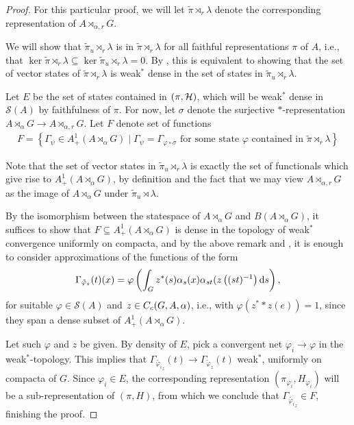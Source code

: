 \begin{proof}
For this particular proof, we will let $\tilde \pi \rtimes_r \lambda$ denote the corresponding representation of $A \rtimes_{\alpha,r}G$.

We will show that $\tilde \pi_u \rtimes_r \lambda$ is  in $\tilde \pi \rtimes_r \lambda$ for all faithful representations $\pi$ of $A$, i.e., that $\ker \tilde \pi \rtimes_r \lambda \subseteq \ker\tilde \pi_u \rtimes_r \lambda = 0$. By \cite[80]{dixmier1969c}, this is equivalent to showing that the set of vector states of $\tilde \pi \rtimes_r \lambda$ is weak$^*$ dense in the set of states in $\tilde \pi_u \rtimes_r \lambda$.

Let $E$ be the set of states contained in $(\pi,\mathcal{H})$, which will be weak$^*$ dense in $\mathcal{S}(A)$ by faithfulness of $\pi$. For now, let $\sigma$ denote the surjective $*$-representation $A \rtimes_\alpha G \to A \rtimes_{\alpha,r}G$. Let $F$ denote set of functions
\begin{align*}
	F = \left\{  \Gamma_\psi \in A_+^1(A\rtimes_\alpha G) \mid \Gamma_\psi = \Gamma_{\varphi \circ \sigma} \text{ for some state } \varphi \text{ contained in } \tilde \pi \rtimes_r \lambda \right\}
\end{align*}

Note that the set of vector states in $\tilde \pi_u \rtimes_r \lambda$ is exactly the set of functionals which give rise to $A_+^1(A \rtimes_\alpha G)$, by definition and the fact that we may view $A \rtimes_{\alpha,r} G$ as the image of $A \rtimes_\alpha G$ under $\tilde \pi_u \rtimes \lambda$.

By the isomorphism between the statespace of $A \rtimes_\alpha G$ and $B(A \rtimes_\alpha G)$, it suffices to show that $F \subseteq A_+^1(A \rtimes_\alpha G)$ is dense in the topology of weak$^*$ convergence uniformly on compacta, and by the above remark and , it is enough to consider approximations of the functions of the form
\begin{align*}
	\Gamma_{\tilde \varphi_z}(t) (x) =\varphi\left( \int_G z^*(s) \alpha_s(x) \alpha_{st}(z\left( (st)^{-1} \right)\mathrm{d} s \right),
\end{align*}
for suitable $\varphi \in \mathcal{S}(A)$ and $z \in C_c(G,A,\alpha)$, i.e., with $\varphi(z^* \ast z(e)) = 1$, since they span a dense subset of $A_+^1(A \rtimes_\alpha G)$.

Let such $\varphi$ and $z$ be given. By density of $E$, pick a convergent net $\varphi_i \to \varphi$ in the weak$^*$-topology. This implies that $\Gamma_{\tilde {\varphi_i}_z}(t) \to \Gamma_{\tilde \varphi_z}(t)$ weak$^*$, uniformly on compacta of $G$. Since $\varphi_i \in E$, the corresponding representation $(\pi_{\varphi_i},H_{\varphi_i})$ will be a sub-representation of $(\pi,H)$, from which we conclude that $\Gamma_{\tilde {\varphi_i}_z} \in F$, finishing the proof.
\end{proof}
